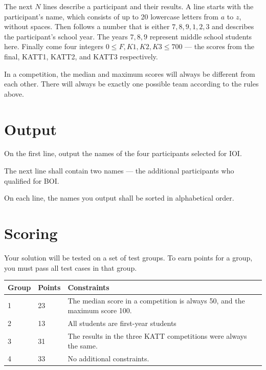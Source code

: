 The next $N$ lines describe a participant and their results.
A line starts with the participant's name, which consists of up to 20 lowercase letters from $a$ to $z$, without spaces.
Then follows a number that is either $7, 8, 9, 1, 2, 3$ and describes the participant's school year. The years $7, 8, 9$ represent middle school students here.
Finally come four integers $0 \le F, K1, K2, K3 \le 700$ --- the scores from the final, KATT1, KATT2, and KATT3 respectively.

In a competition, the median and maximum scores will always be different from each other.
There will always be exactly one possible team according to the rules above.

\section*{Output}
On the first line, output the names of the four participants selected for IOI.

The next line shall contain two names --- the additional participants who qualified for BOI.

On each line, the names you output shall be sorted in alphabetical order.

\section*{Scoring}
Your solution will be tested on a set of test groups. To earn points for a group, you must pass all test cases in that group.

\begin{tabular}{| l | l | l | l |}
\hline
Group & Points & Constraints \\ \hline
1     & 23         & The median score in a competition is always 50, and the maximum score 100. \\ \hline
2     & 13         & All students are first-year students \\ \hline
3     & 31         & The results in the three KATT competitions were always the same. \\ \hline
4     & 33         & No additional constraints. \\ \hline
\end{tabular}
